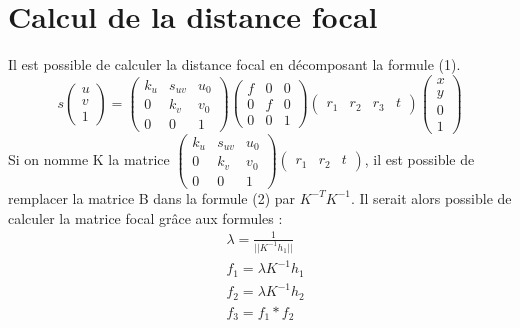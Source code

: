 \documentclass[a4paper,10pt]{article}
\begin{document}
\section{Calcul de la distance focal}
Il est possible de calculer la distance focal en décomposant la formule (1).
\begin{equation}
 s\begin{pmatrix}u\\v\\1\end{pmatrix} = \begin{pmatrix}k_u&s_{uv}&u_0\\0&k_v&v_0\\0&0&1\end{pmatrix}\begin{pmatrix}f&0&0\\0&f&0\\0&0&1\end{pmatrix}
					\begin{pmatrix}r_1&r_2&r_3&t\end{pmatrix}\begin{pmatrix}x\\y\\0\\1\end{pmatrix}
\end{equation}
Si on nomme K la matrice $\begin{pmatrix}k_u&s_{uv}&u_0\\0&k_v&v_0\\0&0&1\end{pmatrix}\begin{pmatrix}r_1&r_2&t\end{pmatrix}$, il est possible de 
remplacer la matrice B dans la formule (2) par $K^{-T}K^{-1}$. 
Il serait alors possible de calculer la matrice focal grâce aux formules :
\begin{align}
 &\lambda = \frac{1}{||K^{-1}h_1||}\\
 &f_1=\lambda K^{-1}h_1\\
 &f_2=\lambda K^{-1}h_2\\
 &f_3=f_1*f_2\\
\end{align}
\end{document}
